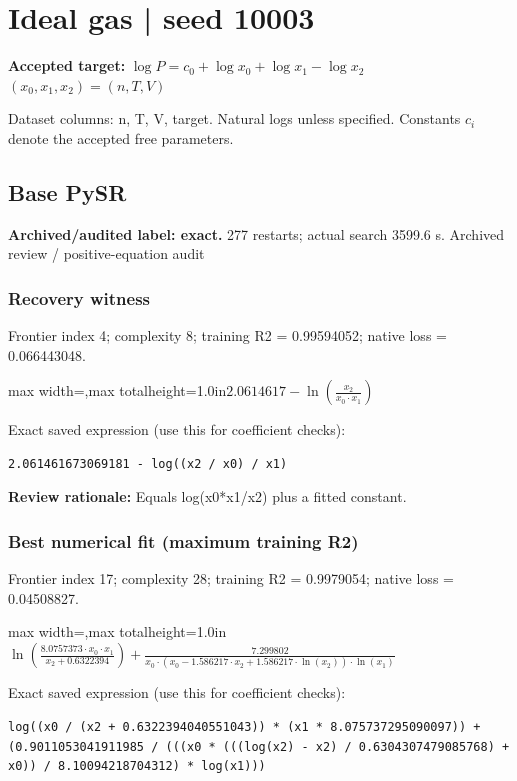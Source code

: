\documentclass[10pt,letterpaper,landscape]{article}
\begin{document}
\section*{Ideal gas | seed 10003}
\textbf{Accepted target:} $\displaystyle \log P=c_0+\log x_0+\log x_1-\log x_2$\hfill $(x_0,x_1,x_2)=(n,T,V)$\par
{\small Dataset columns: n, T, V, target. Natural logs unless specified. Constants $c_i$ denote the accepted free parameters.}\par\medskip
\begin{minipage}[t]{0.485\textwidth}
\subsection*{Base PySR}
\textbf{Archived/audited label: exact.} 277 restarts; actual search 3599.6 s.
{\small Archived review / positive-equation audit}
\subsubsection*{Recovery witness}
Frontier index 4; complexity 8; training R2 = 0.99594052; native loss = 0.066443048.
\begin{center}\begin{adjustbox}{max width=\linewidth,max totalheight=1.0in}$\displaystyle 2.0614617 - \ln{\left(\frac{x_{2}}{x_{0} \cdot x_{1}} \right)}$\end{adjustbox}\end{center}
{\scriptsize Exact saved expression (use this for coefficient checks):}
\begin{lstlisting}
2.061461673069181 - log((x2 / x0) / x1)
\end{lstlisting}
{\small\textbf{Review rationale:} Equals log(x0*x1/x2) plus a fitted constant.}
\subsubsection*{Best numerical fit (maximum training R2)}
Frontier index 17; complexity 28; training R2 = 0.9979054; native loss = 0.04508827.
\begin{center}\begin{adjustbox}{max width=\linewidth,max totalheight=1.0in}$\displaystyle \ln{\left(\frac{8.0757373 \cdot x_{0} \cdot x_{1}}{x_{2} + 0.6322394} \right)} + \frac{7.299802}{x_{0} \cdot \left(x_{0} - 1.586217 \cdot x_{2} + 1.586217 \cdot \ln{\left(x_{2} \right)}\right) \cdot \ln{\left(x_{1} \right)}}$\end{adjustbox}\end{center}
{\scriptsize Exact saved expression (use this for coefficient checks):}
\begin{lstlisting}
log((x0 / (x2 + 0.6322394040551043)) * (x1 * 8.075737295090097)) + (0.9011053041911985 / (((x0 * (((log(x2) - x2) / 0.6304307479085768) + x0)) / 8.10094218704312) * log(x1)))
\end{lstlisting}
\end{minipage}\hfill
\end{document}
